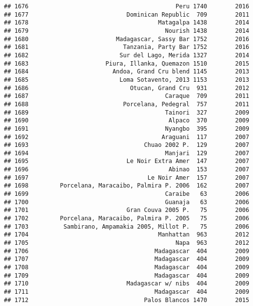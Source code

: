 \documentclass[
]{article}
\begin{document}
\begin{verbatim}
## 1676                                          Peru 1740        2016
## 1677                            Dominican Republic  709        2011
## 1678                                     Matagalpa 1438        2014
## 1679                                       Nourish 1438        2014
## 1680                         Madagascar, Sassy Bar 1752        2016
## 1681                           Tanzania, Party Bar 1752        2016
## 1682                          Sur del Lago, Merida 1327        2014
## 1683                      Piura, Illanka, Quemazon 1510        2015
## 1684                        Andoa, Grand Cru blend 1145        2013
## 1685                          Loma Sotavento, 2013 1153        2013
## 1686                             Otucan, Grand Cru  931        2012
## 1687                                       Caraque  709        2011
## 1688                           Porcelana, Pedegral  757        2011
## 1689                                       Tainori  327        2009
## 1690                                        Alpaco  370        2009
## 1691                                       Nyangbo  395        2009
## 1692                                      Araguani  117        2007
## 1693                                 Chuao 2002 P.  129        2007
## 1694                                       Manjari  129        2007
## 1695                            Le Noir Extra Amer  147        2007
## 1696                                        Abinao  153        2007
## 1697                                  Le Noir Amer  157        2007
## 1698         Porcelana, Maracaibo, Palmira P. 2006  162        2007
## 1699                                       Caraibe   63        2006
## 1700                                       Guanaja   63        2006
## 1701                            Gran Couva 2005 P.   75        2006
## 1702         Porcelana, Maracaibo, Palmira P. 2005   75        2006
## 1703          Sambirano, Ampamakia 2005, Millot P.   75        2006
## 1704                                     Manhattan  963        2012
## 1705                                          Napa  963        2012
## 1706                                    Madagascar  404        2009
## 1707                                    Madagascar  404        2009
## 1708                                    Madagascar  404        2009
## 1709                                    Madagascar  404        2009
## 1710                            Madagascar w/ nibs  404        2009
## 1711                                    Madagascar  404        2009
## 1712                                 Palos Blancos 1470        2015

\end{verbatim}
\end{document}
